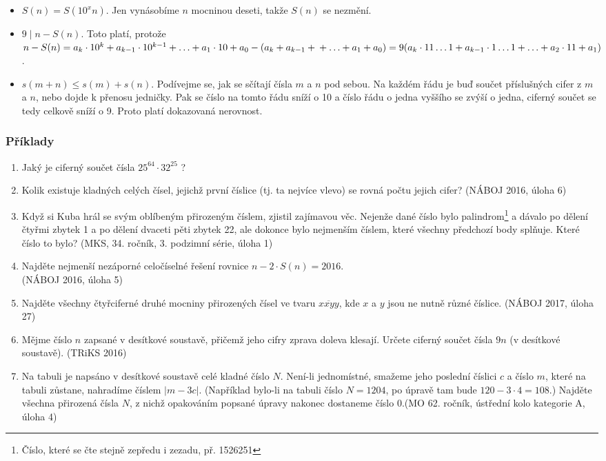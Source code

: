 \documentclass[12pt,a4paper]{report}
\begin{document}
\begin{itemize}
\item[] $S(n)=S(10^xn)$. Jen vynásobíme $n$ mocninou deseti, takže $S(n)$ se nezmění.
\item[] $9 \mid n - S(n)$. Toto platí, protože $n - S(n)=a_k \cdot 10^k + a_{k-1} \cdot 10^{k-1} + \ldots + a_1 \cdot 10 + a_0 - (a_k + a_{k-1} + \\+\ldots + a_1 + a_0)=9(a_k \cdot 11\ldots1 + a_{k-1} \cdot 1\ldots1 + \ldots + a_2 \cdot 11 + a_1)$.
\item[] $s(m + n) \leq s(m) + s(n)$. Podívejme se, jak se sčítají čísla $m$ a $n$ pod sebou. Na každém
	řádu je buď součet příslušných cifer z $m$ a $n$, nebo dojde k přenosu jedničky. Pak se číslo
	na tomto řádu sníží o 10 a číslo řádu o jedna vyššího se zvýší o jedna, ciferný součet se
	tedy celkově sníží o 9. Proto platí dokazovaná nerovnost.
\end{itemize}

\subsubsection*{Příklady}		
\begin{enumerate}
	\item Jaký je ciferný součet čísla $25^{64}\cdot32^{25}$ ?
	\item Kolik existuje kladných celých čísel, jejichž první číslice (tj. ta nejvíce vlevo) se rovná počtu jejich cifer? \hfill(NÁBOJ 2016, úloha 6)
	\item Když si Kuba hrál se svým oblíbeným přirozeným číslem, zjistil zajímavou věc. Nejenže dané číslo bylo palindrom\footnote{Číslo, které se čte stejně zepředu i zezadu, př. 1526251} a dávalo po dělení čtyřmi zbytek 1 a po dělení dvaceti pěti zbytek 22, ale dokonce bylo nejmenším číslem, které všechny předchozí body splňuje. Které číslo to bylo?
\hfill (MKS, 34. ročník, 3. podzimní série, úloha 1)
	
	\item Najděte nejmenší nezáporné celočíselné řešení rovnice $n-2\cdot S(n)=2016$. \\\hfill(NÁBOJ 2016, úloha 5)
	\item Najděte všechny čtyřciferné druhé mocniny přirozených čísel ve tvaru $\overline{xxyy}$, kde $x$ a $y$ jsou ne nutně různé číslice. \hfill(NÁBOJ 2017, úloha 27)
	\item Mějme číslo $n$ zapsané v desítkové soustavě, přičemž jeho cifry zprava doleva
	klesají. Určete ciferný součet čísla $9n$ (v desítkové
	soustavě). \hfill(TRiKS 2016)
	\item Na tabuli je napsáno v desítkové soustavě celé kladné číslo $N$. Není-li jednomístné,
	smažeme jeho poslední číslici $c$ a číslo $m$, které na tabuli zůstane, nahradíme číslem
	$|m - 3c|$. (Například bylo-li na tabuli číslo $N = 1 204$, po úpravě tam bude $120 - 3 \cdot 4 = 108$.) Najděte všechna přirozená čísla $N$, z nichž opakováním popsané
	úpravy nakonec dostaneme číslo 0.\hfill(MO 62. ročník, ústřední kolo kategorie A, úloha 4)
\end{enumerate}	
\end{document}

